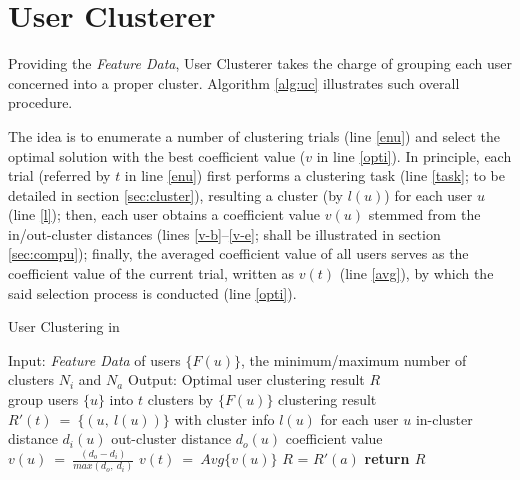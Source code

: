 \section{User Clusterer}
\label{sec:uc}


Providing the \textit{Feature Data}, User Clusterer takes the charge of grouping each user concerned into a proper cluster.
Algorithm \ref{alg:uc} illustrates such overall procedure.

The idea is to enumerate a number of clustering trials (line \ref{enu}) and select the optimal solution with the best coefficient value ($v$ in line \ref{opti}).
In principle, each trial (referred by $t$ in line \ref{enu}) first performs a clustering task (line \ref{task}; to be detailed in section \ref{sec:cluster}), resulting a cluster (by $l(u)$) for each user $u$ (line \ref{l});
then, each user obtains a coefficient value $v(u)$ stemmed from the in/out-cluster distances (lines \ref{v-b}--\ref{v-e}; shall be illustrated in section \ref{sec:compu});
finally, the averaged coefficient value of all users serves as the coefficient value of the current trial, written as $v(t)$ (line \ref{avg}), by which the said selection process is conducted (line \ref{opti}).


\begin{algorithm}[t]
\begin{small}
\caption{User Clustering in \sys{}}
\label{alg:uc}

\begin{algorithmic}[1]
\State Input: \textit{Feature Data} of users $\{F(u)\}$, the minimum/maximum number of clusters $N_i$ and $N_a$
\State Output: Optimal user clustering result $R$
\\
 \label{enu}
	\State group users $\{u\}$ into $t$ clusters by $\{F(u)\}$ \label{task}
	\State clustering result $R'(t)\ =\ \{(u,\ l(u))\}$ with cluster info $l(u)$ for each user $u$ \label{l}
		\State in-cluster distance $d_i(u)$ \label{v-b}
		\State out-cluster distance $d_o(u)$
		\State coefficient value $v(u)\ =\ \frac{(d_o - d_i)}{max(d_o,\ d_i)}$ \label{v-e}
	\EndFor
	\State $v(t)\ =\ Avg\{v(u)\}$ \label{avg}
\EndFor
{} \label{opti}
	\State $R$ = $R'(a)$
\EndIf
\State \bfseries{return} $R$
\end{algorithmic}
\end{small}
\end{algorithm}


